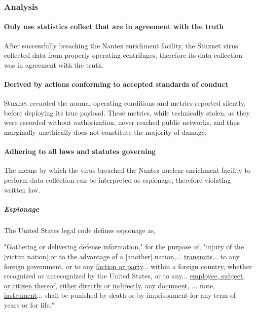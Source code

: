 \documentclass[12pt]{article}
\begin{document}
\begin{multicols}{2}
\subsubsection{Analysis}

\paragraph{Only use statistics collect that are in agreement with the truth}

After successfully breaching the Nantez enrichment facility, the Stuxnet virus collected data from properly operating centrifuges, therefore its data collection was in agreement with the truth.

\paragraph{Derived by actions conforming to accepted standards of conduct}

Stuxnet recorded the normal operating conditions and metrics reported silently, before deploying its true payload. These metrics, while technically stolen, as they were recorded without authorization, never reached public networks, and thus marginally unethically does not constitute the majority of damage.

\paragraph{Adhering to all laws and statutes governing}

The means by which the virus breached the Nantez nuclear enrichment facility to perform data collection can be interpreted as espionage, therefore violating written law.

\subparagraph{Espionage}

The United States legal code defines espionage as,

\begin{displayquote}
"Gathering or delivering defense information," for the purpose of, "injury of the [victim nation] or to the advantage of a [another] nation,... \ul{transmits}... to any foreign government, or to any \ul{faction or party}... within a foreign country, whether recognized or unrecognized by the United States, or to any... \ul{employee, subject, or citizen thereof}, \ul{either directly or indirectly}, any \ul{document}, ... note, \ul{instrument}... shall be punished by death or by imprisonment for any term of years or for life."\cite{USEspionageLegalDefinition}
\end{displayquote}


\end{multicols}
\end{document}
